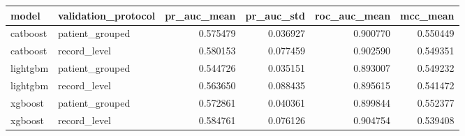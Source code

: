\begin{tabular}{llrrrr}
\toprule
model & validation\_protocol & pr\_auc\_mean & pr\_auc\_std & roc\_auc\_mean & mcc\_mean \\
\midrule
catboost & patient\_grouped & 0.575479 & 0.036927 & 0.900770 & 0.550449 \\
catboost & record\_level & 0.580153 & 0.077459 & 0.902590 & 0.549351 \\
lightgbm & patient\_grouped & 0.544726 & 0.035151 & 0.893007 & 0.549232 \\
lightgbm & record\_level & 0.563650 & 0.088435 & 0.895615 & 0.541472 \\
xgboost & patient\_grouped & 0.572861 & 0.040361 & 0.899844 & 0.552377 \\
xgboost & record\_level & 0.584761 & 0.076126 & 0.904754 & 0.539408 \\
\bottomrule
\end{tabular}
